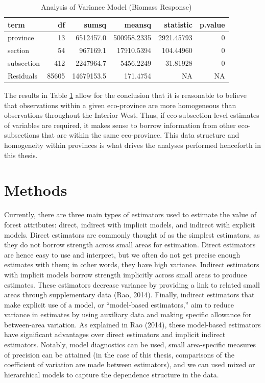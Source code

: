 \documentclass[12pt,twoside]{reedthesis}
\begin{document}
\clearpage
\begin{longtable}[t]{lrrrrr}
\caption{\label{tab:anova}Analysis of Variance Model (Biomass Response)}\\
\toprule
term & df & sumsq & meansq & statistic & p.value\\
\midrule
province & 13 & 6512457.0 & 500958.2335 & 2921.45793 & 0\\
section & 54 & 967169.1 & 17910.5394 & 104.44960 & 0\\
subsection & 412 & 2247964.7 & 5456.2249 & 31.81928 & 0\\
Residuals & 85605 & 14679153.5 & 171.4754 & NA & NA\\
\bottomrule
\end{longtable}
The results in Table \ref{tab:anova} allow for the conclusion that it is reasonable to believe that observations within a given eco-province are more homogeneous than observations throughout the Interior West. Thus, if eco-subsection level estimates of variables are required, it makes sense to borrow information from other eco-subsections that are within the same eco-province. This data structure and homogeneity within provinces is what drives the analyses performed henceforth in this thesis.

\hypertarget{methods}{%
\chapter{Methods}\label{methods}}

Currently, there are three main types of estimators used to estimate the value of forest attributes: direct, indirect with implicit models, and indirect with explicit models. Direct estimators are commonly thought of as the simplest estimators, as they do not borrow strength across small areas for estimation. Direct estimators are hence easy to use and interpret, but we often do not get precise enough estimates with them; in other words, they have high variance. Indirect estimators with implicit models borrow strength implicitly across small areas to produce estimates. These estimators decrease variance by providing a link to related small areas through supplementary data (Rao, 2014). Finally, indirect estimators that make explicit use of a model, or ``model-based estimators,'' aim to reduce variance in estimates by using auxiliary data and making specific allowance for between-area variation. As explained in Rao (2014), these model-based estimators have significant advantages over direct estimators and implicit indirect estimators. Notably, model diagnostics can be used, small area-specific measures of precision can be attained (in the case of this thesis, comparisons of the coefficient of variation are made between estimators), and we can used mixed or hierarchical models to capture the dependence structure in the data.
\end{document}
